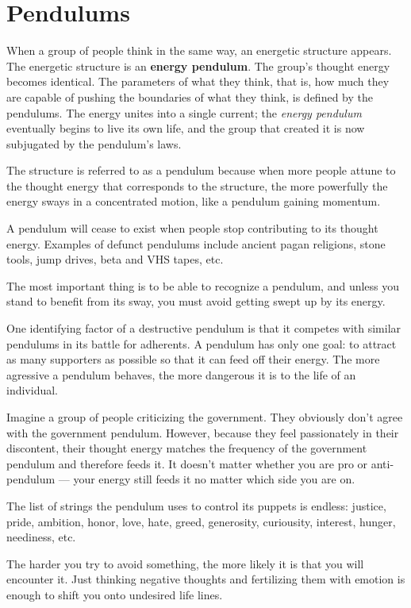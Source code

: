 \documentclass[
  openany]{book}
\begin{document}
\hypertarget{pendulums}{%
\chapter{Pendulums}\label{pendulums}}

When a group of people think in the same way, an energetic structure appears. The energetic structure is an \textbf{energy pendulum}. The group's thought energy becomes identical. The parameters of what they think, that is, how much they are capable of pushing the boundaries of what they think, is defined by the pendulums. The energy unites into a single current; the \emph{energy pendulum} eventually begins to live its own life, and the group that created it is now subjugated by the pendulum's laws.

The structure is referred to as a pendulum because when more people attune to the thought energy that corresponds to the structure, the more powerfully the energy sways in a concentrated motion, like a pendulum gaining momentum.

A pendulum will cease to exist when people stop contributing to its thought energy. Examples of defunct pendulums include ancient pagan religions, stone tools, jump drives, beta and VHS tapes, etc.

The most important thing is to be able to recognize a pendulum, and unless you stand to benefit from its sway, you must avoid getting swept up by its energy.

One identifying factor of a destructive pendulum is that it competes with similar pendulums in its battle for adherents. A pendulum has only one goal: to attract as many supporters as possible so that it can feed off their energy. The more agressive a pendulum behaves, the more dangerous it is to the life of an individual.

Imagine a group of people criticizing the government. They obviously don't agree with the government pendulum. However, because they feel passionately in their discontent, their thought energy matches the frequency of the government pendulum and therefore feeds it. It doesn't matter whether you are pro or anti-pendulum --- your energy still feeds it no matter which side you are on.

The list of strings the pendulum uses to control its puppets is endless: justice, pride, ambition, honor, love, hate, greed, generosity, curiousity, interest, hunger, neediness, etc.

The harder you try to avoid something, the more likely it is that you will encounter it. Just thinking negative thoughts and fertilizing them with emotion is enough to shift you onto undesired life lines.
\end{document}
